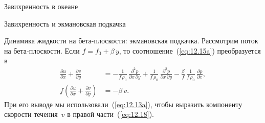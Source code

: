 \begin{chapter}{Завихренность в океане}
\begin{section}{Завихренность и экмановская подкачка}
\begin{paragraph}{Динамика жидкости на бета-плоскости: экмановская подкачка.}
Рассмотрим поток на бета-плоскости. Если $f = f_0 + \beta\,y$, 
то соотношение~(\ref{eq:12.15a}) преобразуется в
\begin{align}
\frac{\partial{u}}{\partial{x}} + \frac{\partial{v}}{\partial{y}} 
  &= - \frac{1}{f\,\rho_{0}}\, \frac{\partial ^2 p}{\partial{x}\,\partial{y}} 
     + \frac{1}{f\,\rho_{0}} \, \frac{\partial ^2 p}{\partial{x}\,\partial{y}} 
     - \frac{\beta}{f} \,\frac{1}{f\,\rho_{0}}\,\frac{\partial{p}}{\partial{x}},\label{eq:12.17}\\
f \left( \frac{\partial{u}}{\partial{x}} + \frac{\partial{v}}{\partial{y}} \right) 
  &= - \beta \, v.\label{eq:12.18}
\end{align}
При его выводе мы использовали~(\ref{eq:12.13a}), чтобы выразить компоненту
скорости течения~$v$ в правой части~(\ref{eq:12.18}).  
%


\end{paragraph}
\end{section}
\end{chapter}
